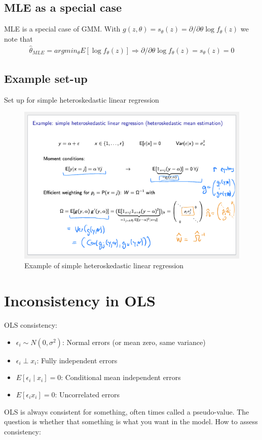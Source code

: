 \documentclass{article}
\begin{document}
\subsection{MLE as a special case}
MLE is a special case of GMM. With $g(z, \theta) = s_\theta(z) = \partial/\partial\theta \log f_\theta(z)$ we note that 
\begin{align*}
  \hat{\theta}_{MLE} = argmin_\theta E[\log f_\theta(z)] \Longrightarrow \partial/\partial\theta \log f_\theta(z) = s_\theta(z) = 0
\end{align*}

\subsection{Example set-up}
Set up for simple heteroskedastic linear regression
\begin{figure}[h]
  \centering
  \includegraphics[width=.4\textwidth]{"gmm_hetero.png"}
  \caption{Example of simple heteroskedastic linear regression}
\end{figure}



\section{Inconsistency in OLS}
OLS consistency: 
\begin{itemize}
  \item $\epsilon_i \sim N(0, \sigma^2)$: Normal errors (or mean zero, same variance)
  \item $\epsilon_i \perp x_i$: Fully independent errors
  \item $E[\epsilon_i \mid x_i] = 0$: Conditional mean independent errors
  \item $E[\epsilon_i x_i] = 0$: Uncorrelated errors
\end{itemize}

OLS is always consistent for something, often times called a pseudo-value. The question is whether that something is what you want in the model. How to assess consistency:
\end{document}

